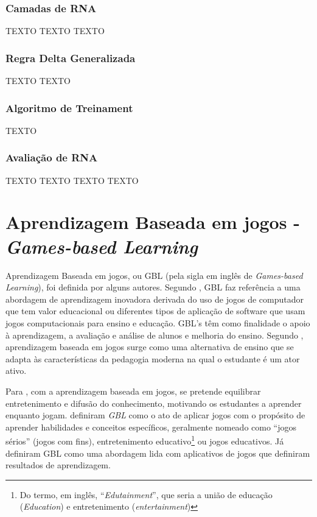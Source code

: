 \subsubsection{Camadas de RNA}
{\color{red}TEXTO}
{\color{red}TEXTO}
{\color{red}TEXTO}
\subsubsection{Regra Delta Generalizada}
{\color{red}TEXTO}
{\color{red}TEXTO}
\subsubsection{Algoritmo de Treinament}
{\color{red}TEXTO}
\subsubsection{Avaliação de RNA}
{\color{red}TEXTO}
{\color{red}TEXTO}
{\color{red}TEXTO}
{\color{red}TEXTO}




\section{Aprendizagem Baseada em jogos - \textit{Games-based Learning}}
\label{sec:GBL}

Aprendizagem Baseada em jogos, ou GBL (pela sigla em inglês de \textit{Games-based Learning}), foi definida por alguns autores. Segundo , GBL faz referência a uma abordagem de aprendizagem inovadora derivada do uso de jogos de computador que tem valor educacional ou diferentes tipos de aplicação de software que usam jogos computacionais para ensino e educação. GBL's têm como finalidade o apoio à aprendizagem, a avaliação e análise de alunos e melhoria do ensino. Segundo , aprendizagem baseada em jogos surge como uma alternativa de ensino que se adapta às características da pedagogia moderna na qual o estudante é um ator ativo.

Para , com a aprendizagem baseada em jogos, se pretende equilibrar entretenimento e difusão do conhecimento, motivando os estudantes a aprender enquanto jogam.  definiram \textit{GBL} como o ato de aplicar jogos com o propósito de aprender habilidades e conceitos específicos, geralmente nomeado como “jogos sérios” (jogos com fins), entretenimento educativo\footnote{Do termo, em inglês, “\textit{Edutainment}”, que seria a união de educação (\textit{Education}) e entretenimento (\textit{entertainment})} ou jogos educativos. Já  definiram GBL como uma abordagem lida com aplicativos de jogos que definiram resultados de aprendizagem.

